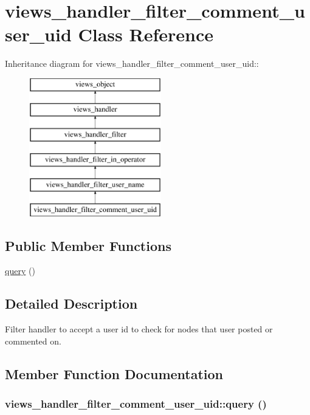 \hypertarget{classviews__handler__filter__comment__user__uid}{
\section{views\_\-handler\_\-filter\_\-comment\_\-user\_\-uid Class Reference}
\label{classviews__handler__filter__comment__user__uid}
}
Inheritance diagram for views\_\-handler\_\-filter\_\-comment\_\-user\_\-uid::\begin{figure}[H]
\begin{center}
\leavevmode
\includegraphics[height=6cm]{classviews__handler__filter__comment__user__uid}
\end{center}
\end{figure}
\subsection*{Public Member Functions}
\begin{CompactItemize}
\item 
\hyperlink{classviews__handler__filter__comment__user__uid_5b649bd04038ac8ed577410ad54ad5b0}{query} ()
\end{CompactItemize}


\subsection{Detailed Description}
Filter handler to accept a user id to check for nodes that user posted or commented on. 

\subsection{Member Function Documentation}
\hypertarget{classviews__handler__filter__comment__user__uid_5b649bd04038ac8ed577410ad54ad5b0}{
\subsubsection[{query}]{\setlength{\rightskip}{0pt plus 5cm}views\_\-handler\_\-filter\_\-comment\_\-user\_\-uid::query ()}}
\label{classviews__handler__filter__comment__user__uid_5b649bd04038ac8ed577410ad54ad5b0}


